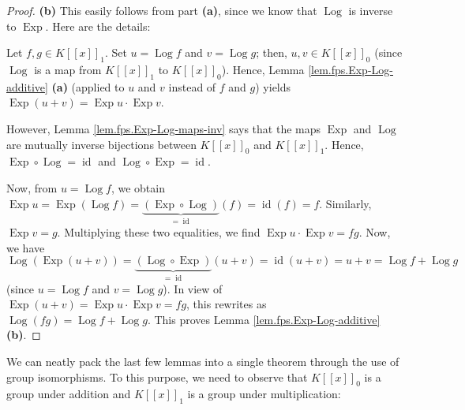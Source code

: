 \begin{proof}
\bigskip

\textbf{(b)} This easily follows from part \textbf{(a)}, since we know that
$\operatorname*{Log}$ is inverse to $\operatorname*{Exp}$. Here are the details:

Let $f,g\in K\left[  \left[  x\right]  \right]  _{1}$. Set
$u=\operatorname*{Log}f$ and $v=\operatorname*{Log}g$; then, $u,v\in K\left[
\left[  x\right]  \right]  _{0}$ (since $\operatorname*{Log}$ is a map from
$K\left[  \left[  x\right]  \right]  _{1}$ to $K\left[  \left[  x\right]
\right]  _{0}$). Hence, Lemma \ref{lem.fps.Exp-Log-additive} \textbf{(a)}
(applied to $u$ and $v$ instead of $f$ and $g$) yields $\operatorname*{Exp}%
\left(  u+v\right)  =\operatorname*{Exp}u\cdot\operatorname*{Exp}v$.

However, Lemma \ref{lem.fps.Exp-Log-maps-inv} says that the maps
$\operatorname*{Exp}$ and $\operatorname*{Log}$ are mutually inverse
bijections between $K\left[  \left[  x\right]  \right]  _{0}$ and $K\left[
\left[  x\right]  \right]  _{1}$. Hence, $\operatorname*{Exp}\circ
\operatorname*{Log}=\operatorname*{id}$ and $\operatorname*{Log}%
\circ\operatorname*{Exp}=\operatorname*{id}$.

Now, from $u=\operatorname*{Log}f$, we obtain $\operatorname*{Exp}%
u=\operatorname*{Exp}\left(  \operatorname*{Log}f\right)  =\underbrace{\left(
\operatorname*{Exp}\circ\operatorname*{Log}\right)  }_{=\operatorname*{id}%
}\left(  f\right)  =\operatorname*{id}\left(  f\right)  =f$. Similarly,
$\operatorname*{Exp}v=g$. Multiplying these two equalities, we find
$\operatorname*{Exp}u\cdot\operatorname*{Exp}v=fg$. Now, we have%
\[
\operatorname*{Log}\left(  \operatorname*{Exp}\left(  u+v\right)  \right)
=\underbrace{\left(  \operatorname*{Log}\circ\operatorname*{Exp}\right)
}_{=\operatorname*{id}}\left(  u+v\right)  =\operatorname*{id}\left(
u+v\right)  =u+v=\operatorname*{Log}f+\operatorname*{Log}g
\]
(since $u=\operatorname*{Log}f$ and $v=\operatorname*{Log}g$). In view of
$\operatorname*{Exp}\left(  u+v\right)  =\operatorname*{Exp}u\cdot
\operatorname*{Exp}v=fg$, this rewrites as $\operatorname*{Log}\left(
fg\right)  =\operatorname*{Log}f+\operatorname*{Log}g$. This proves Lemma
\ref{lem.fps.Exp-Log-additive} \textbf{(b)}.
\end{proof}

We can neatly pack the last few lemmas into a single theorem through the use
of group isomorphisms. To this purpose, we need to observe that $K\left[
\left[  x\right]  \right]  _{0}$ is a group under addition and $K\left[
\left[  x\right]  \right]  _{1}$ is a group under multiplication:


